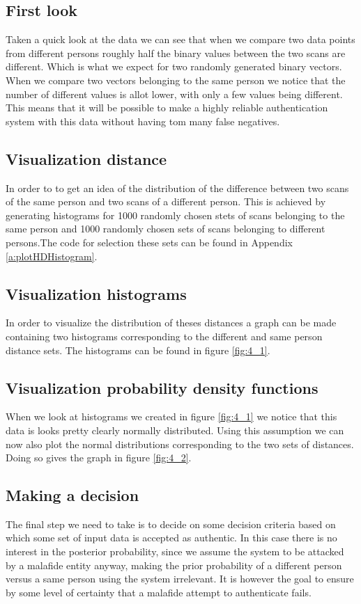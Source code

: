 \documentclass[10pt,a4paper]{article}
\begin{document}
\subsection{First look}
Taken a quick look at the data we can see that when we compare two data points from different persons roughly half the binary values between the two scans are different. Which is what we expect for two randomly generated binary vectors. When we compare two vectors belonging to the same person we notice that the number of different values is allot lower, with only a few values being different. This means that it will be possible to make a highly reliable authentication system with this data without having tom many false negatives.

\subsection{Visualization distance}
In order to to get an idea of the distribution of the difference between two scans of the same person and two scans of a different person. This is achieved by generating histograms for 1000 randomly chosen stets of scans belonging to the same person and 1000 randomly chosen sets of scans belonging to different persons.The code for selection these sets can be found in Appendix \ref{a:plotHDHistogram}. 

\subsection{Visualization histograms}
In order to visualize the distribution of theses distances a graph can be made containing two histograms corresponding to the different and same person distance sets. The histograms can be found in figure \ref{fig:4_1}.

\subsection{Visualization probability density functions}
When we look at histograms we created in figure \ref{fig:4_1} we notice that this data is looks pretty clearly normally distributed. Using this assumption we can now also plot the normal distributions corresponding to the two sets of distances. Doing so gives the graph in figure \ref{fig:4_2}. 

\subsection{Making a decision}
The final step we need to take is to decide on some decision criteria based on which some set of input data is accepted as authentic. In this case there is no interest in the posterior probability, since we assume the system to be attacked by a malafide entity anyway, making the prior probability of a different person versus a same person using the system irrelevant. It is however the goal to ensure by some level of certainty that a malafide attempt to authenticate fails. 
\end{document}
